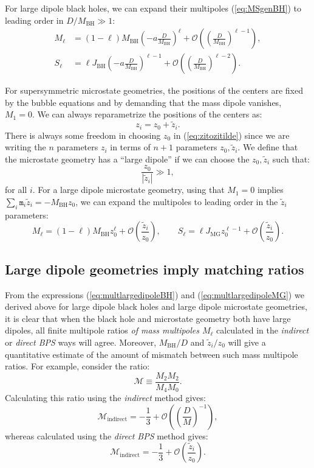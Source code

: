 \documentclass[12pt,a4paper]{article}
\newcommand{\be}{\begin{equation}}
\newcommand{\ee}{\end{equation}}
\newcommand{\mm}{\mathtt{m}}
\def\indirect{\emph{indirect} }
\def\direct{\emph{direct BPS} }
\begin{document}
For large dipole black holes, we can expand their multipoles (\ref{eq:MSgenBH}) to leading order in $D/M_\text{BH}\gg 1$:
\be \label{eq:multlargedipoleBH} \begin{aligned} M_\ell &= (1-\ell)M_\text{BH}\left( -a\frac{D}{M_\text{BH}}\right)^\ell + \mathcal{O}\left(\left(\frac{D}{M_\text{BH}}\right)^{\ell-1}\right),\\ S_\ell &= \ell J_{\text{BH}} \left( -a \frac{D}{M_\text{BH}}\right)^{\ell-1}+\mathcal{O}\left(\left(\frac{D}{M_\text{BH}}\right)^{\ell-2}\right).\end{aligned}\ee

For supersymmetric microstate geometries, the positions of the centers are fixed by the bubble equations and by demanding that the mass dipole vanishes, $M_1=0$. We can always reparametrize the positions of the centers as:
\be \label{eq:zitozitilde} z_i = z_0 + \tilde z_i .\ee
There is always some freedom in choosing $z_0$ in (\ref{eq:zitozitilde}) since we are writing the $n$ parameters $z_i$ in terms of $n+1$ parameters $z_0,\tilde z_i$.
We define that the microstate geometry has a ``large dipole'' if we can choose the $z_0,\tilde z_i$ such that:
\be \label{eq:largedipoleMG} \frac{z_0}{|\tilde z_i|}\gg 1,\ee
for all $i$. For a large dipole microstate geometry, using that $M_1=0$ implies $\sum_i \mm_i \tilde z_i = -M_\text{BH}z_0$, we can expand the multipoles to leading order in the $\tilde z_i$ parameters:
\be \label{eq:multlargedipoleMG} M_\ell = (1-\ell)   M_\text{BH} z_0^\ell + \mathcal{O}\left(\frac{\tilde z_i}{z_0}\right), \qquad S_\ell = \ell J_{\text{MG}} z_0^{\ell-1} + \mathcal{O}\left(\frac{\tilde z_i}{z_0}\right).\ee


\subsection{Large dipole geometries imply matching ratios}\label{sec:forward}
From the expressions (\ref{eq:multlargedipoleBH}) and (\ref{eq:multlargedipoleMG}) we derived above for  large dipole black holes and large dipole microstate geometries, it is clear that when the black hole and microstate geometry both have large dipoles, all finite multipole ratios \emph{of mass multipoles $M_\ell$} calculated in the \indirect or \direct ways will agree. Moreover, $M_\text{BH}/D$ and $\tilde z_i/z_0$ will give a quantitative estimate of the amount of mismatch between such mass multipole ratios. For example, consider the ratio:
\be \mathcal{M} \equiv \frac{M_2M_2}{M_4M_0}.\ee
Calculating this ratio using the \indirect method gives:
\be\label{eq:ratio2240indirectlargeD} \mathcal{M}_{\text{indirect}} = -\frac13 + \mathcal{O}\left(\left(\frac{D}{M}\right)^{-1}\right), \ee
whereas calculated using the \direct method gives:
\be \mathcal{M}_{\text{indirect}} = -\frac13 + \mathcal{O}\left(\frac{\tilde z_i}{z_0}\right).\ee
\end{document}
